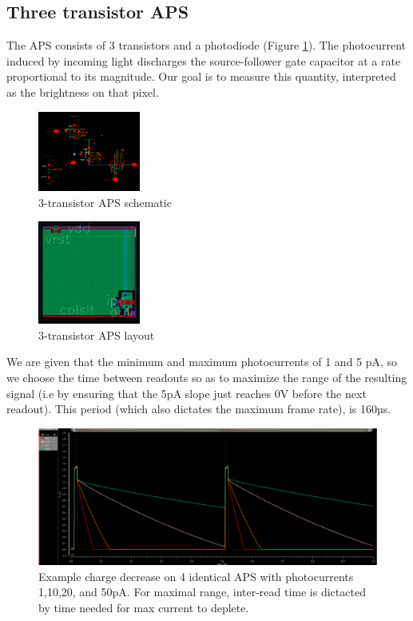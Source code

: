 \documentclass[lettersize,journal]{IEEEtran}
\begin{document}
\subsection{Three transistor APS}
The APS consists of 3 transistors and a photodiode (Figure \ref{apsdraw}). The photocurrent induced by incoming light discharges the source-follower gate capacitor at a rate proportional to its magnitude. Our goal is to measure this quantity, interpreted as the brightness on that pixel.
\begin{figure}[h]
	\centering
	\includegraphics[width =0.3\textwidth]{apschem.png}
	\caption{3-transistor APS schematic}
	\label{apsdraw}
\end{figure}
\begin{figure}[h]
	\centering
	\includegraphics[width =0.3\textwidth]{apslayout.png}
	\caption{3-transistor APS layout}
	\label{apslayout}
\end{figure}

We are given that the minimum and maximum photocurrents of 1 and 5 pA, so we choose the time between readouts so as to maximize the range of the resulting signal (i.e by ensuring that the 5pA slope just reaches 0V before the next readout).
	This period (which also dictates the maximum frame rate), is 160µs.
\begin{figure}[h]
	\centering
	\includegraphics[height =0.2\textwidth]{differentslopes.png}
	\caption{Example charge decrease on 4 identical APS with photocurrents 1,10,20, and 50pA. For maximal range, inter-read time is dictacted by time needed for max current to deplete.}
	\label{differentslopes.png}
\end{figure}
\end{document}
